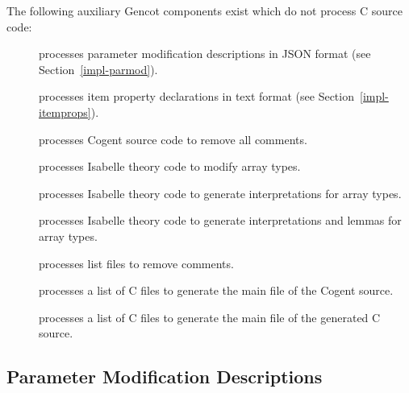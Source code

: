 The following auxiliary Gencot components exist which do not process C source code:
\begin{description}
\item[] processes parameter modification descriptions in JSON format (see Section~\ref{impl-parmod}).
\item[] processes item property declarations in text format (see Section~\ref{impl-itemprops}).
\item[] processes Cogent source code to remove all comments.
\item[] processes Isabelle theory code to modify array types.
\item[] processes Isabelle theory code to generate interpretations for array types.
\item[] processes Isabelle theory code to generate interpretations and lemmas for array types.
\item[] processes list files to remove comments.
\item[] processes a list of C files to generate the main file of the Cogent source.
\item[] processes a list of C files to generate the main file of the generated C source.
\end{description}

\subsection{Parameter Modification Descriptions}
\label{impl-ocomps-parmod}

